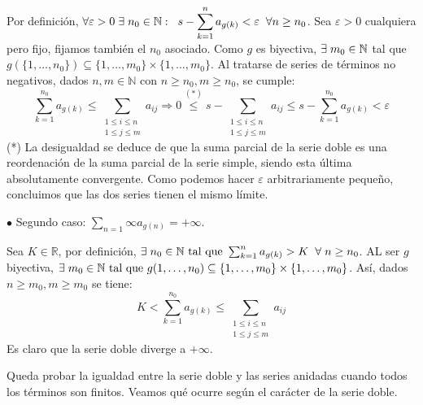 \documentclass[12pt,a4paper]{article}
\newcommand{\R}{\mathbb{R}}
\newcommand{\N}{\mathbb{N}}
\begin{document}
\noindent
Por definición, $\forall \varepsilon > 0 \hspace{1mm} \exists \hspace{1mm} n_0 \in \N : \hspace{2mm} s - \displaystyle{\sum_{k=1}^{n}a_{g(k)}} < \varepsilon \hspace{2mm} \forall n \geq n_0$.
Sea $\varepsilon > 0$ cualquiera pero fijo, fijamos también el $n_0$ asociado.
Como $g$ es biyectiva, $\exists \hspace{1mm} m_0 \in \N$ tal que $g(\{1,\ldots,n_0\}) \subseteq \{1,\ldots, m_0\} \times \{1,\ldots,m_0\}$.
Al tratarse de series de términos no negativos, dados $n,m \in \N$ con $n\geq n_0, m\geq n_0$, se cumple:
$$\sum_{k=1}^{n_0}a_{g(k)} \leq \sum_{\substack{1\leq i \leq n\\1\leq j \leq m}}a_{ij}
\Rightarrow 0 \overset{(*)}{\leq} s -  \sum_{\substack{1\leq i \leq n\\1\leq j \leq m}}a_{ij} \leq s - \sum_{k=1}^{n_0}a_{g(k)} < \varepsilon$$
(*) La desigualdad se deduce de que la suma parcial de la serie doble es una reordenación de la suma parcial de la serie simple, siendo esta última absolutamente convergente.
Como podemos hacer $\varepsilon$ arbitrariamente pequeño, concluimos que las dos series tienen el mismo límite.

\vspace{4mm}
$\bullet$ Segundo caso: $\sum_{n=1}\infty a_{g(n)} = +\infty$.

\vspace{2mm}
Sea $K \in \R$, por definición, $\exists \hspace{1mm} n_0 \in \N \text{ tal que } \sum_{k=1}^{n} a_{g(k)} > K \hspace{2mm} \forall \hspace{1mm} n \geq n_0$.
AL ser $g$ biyectiva, $\exists \hspace{1mm} m_0 \in \N \text{ tal que } g({1,\ldots,n_0}) \subseteq \{1,\ldots, m_0\} \times \{1,\ldots,m_0\}$. Así, dados $n \geq m_0, m\geq m_0$ se tiene:
\\[-3ex] $$K < \sum_{k=1}^{n_0} a_{g(k)} \leq \sum_{\substack{1\leq i \leq n\\1\leq j \leq m}} a_{ij}$$
Es claro que la serie doble diverge a $+\infty$.

\vspace{4mm}
Queda probar la igualdad entre la serie doble y las series anidadas cuando todos los términos son finitos. Veamos qué ocurre según el carácter de la serie doble.
\end{document}

